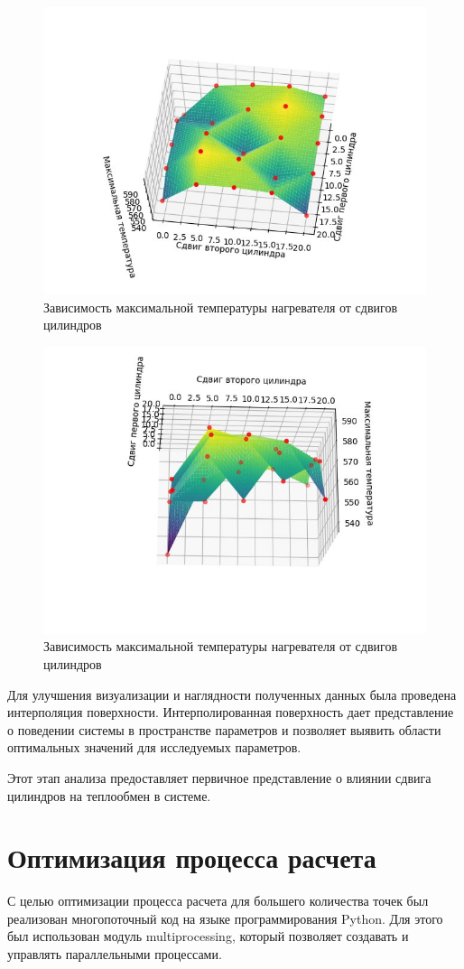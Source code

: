 \documentclass[a4paper,12pt]{article}
\theoremstyle{plain} %
\theoremstyle{definition} %
\theoremstyle{remark} %
\begin{document}
\begin{figure}[h]
	\begin{center}
		\includegraphics[width=0.4\linewidth]{images/16.2.jpg}
		\caption{Зависимость максимальной температуры нагревателя от сдвигов цилиндров} %
	\end{center}
\end{figure}
\newpage
\begin{figure}[h]
	\begin{center}
		\includegraphics[width=0.4\linewidth]{images/16.3.jpg}
		\caption{Зависимость максимальной температуры нагревателя от сдвигов цилиндров} %
	\end{center}
\end{figure}

Для улучшения визуализации и наглядности полученных данных была проведена интерполяция поверхности. Интерполированная поверхность дает представление о поведении системы в пространстве параметров и позволяет выявить области оптимальных значений для исследуемых параметров.

Этот этап анализа предоставляет первичное представление о влиянии сдвига цилиндров на теплообмен в системе.

\section{Оптимизация процесса расчета}

С целью оптимизации процесса расчета для большего количества точек был реализован многопоточный код на языке программирования Python. Для этого был использован модуль multiprocessing, который позволяет создавать и управлять параллельными процессами.
\end{document}
